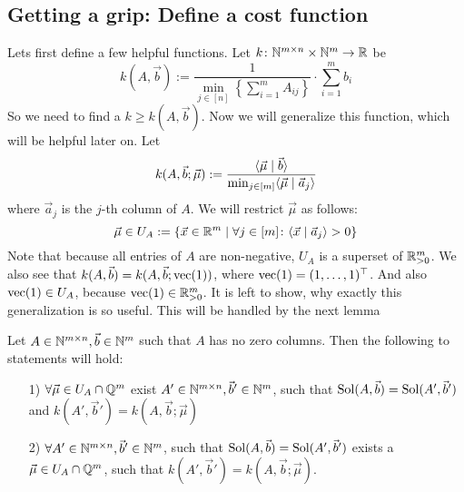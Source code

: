 \subsection{Getting a grip: Define a cost function}
Lets first define a few helpful functions. Let $k\colon \mathbb{N}^{m \times n} \times \mathbb{N}^m \to \mathbb{R}$ be
$$k(A, \vec b) := \frac{1}{\min_{j \in [n]} \left\{ \sum_{i=1}^{m}A_{ij}\right\}}\cdot \sum_{i=1}^{m}b_i$$
So we need to find a $k \geq k(A, \vec b)$. Now we will generalize this function, which will be helpful later on. Let 
$$k(A, \vec b; \vec \mu) := \frac{\langle \vec{\mu} \mid \vec b \rangle}{\min_{j \in [m]} \langle \vec \mu \mid \vec a_j \rangle}$$
where $\vec a_j$ is the $j$-th column of $A$. We will restrict $\vec \mu$ as follows:
$$\vec \mu \in U_A := \{\vec x \in \mathbb{R}^m \mid \forall j \in [m]\colon \langle \vec x \mid \vec a_j \rangle > 0\}$$
Note that because all entries of $A$ are non-negative, $U_A$ is a superset of $\mathbb{R}_{>0}^m$. We also see that $k(A, \vec b) = k(A, \vec b; \operatorname{vec}(1))$, where $\operatorname{vec}(1) = (1, \dots, 1)^\top$. And also $\operatorname{vec}(1) \in U_A$, because $\operatorname{vec}(1) \in \mathbb{R}^m_{>0}$. It is left to show, why exactly this generalization is so useful. This will be handled by the next lemma
\begin{lemma}
    Let $A \in \mathbb{N}^{m \times n}, \vec b \in \mathbb{N}^m$ such that $A$ has no zero columns. Then the following to statements will hold:
    \begin{enumerate}
        \item[1)] $\forall \vec \mu \in U_A \cap \mathbb{Q}^m$ exist $A' \in \mathbb{N}^{m \times n}, \vec b' \in \mathbb{N}^m$, such that $\operatorname{Sol}(A, \vec b) = \operatorname{Sol}(A', \vec b')$ and
        $k(A', \vec b') = k(A, \vec b; \vec\mu)$
        \item[2)] $\forall  A' \in \mathbb{N}^{m \times n}, \vec b' \in \mathbb{N}^m$, such that $\operatorname{Sol}(A, \vec b) = \operatorname{Sol}(A', \vec b')$ exists a $\vec \mu \in U_A \cap \mathbb{Q}^m$, such that 
        $k(A', \vec b') = k(A, \vec b; \vec\mu)$.
    \end{enumerate}
\end{lemma}
